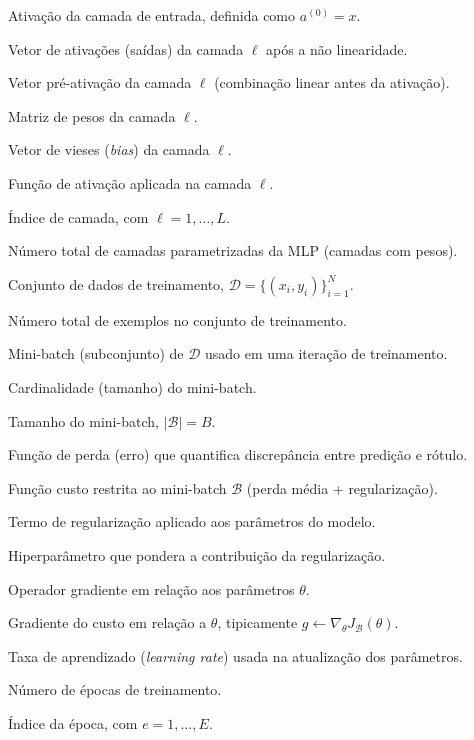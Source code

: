 \documentclass[
	12pt,				%
	oneside,
	a4paper,			%
	english,			%
	french,				%
	spanish,			%
	brazil				%
	]{abntex2}
\begin{document}
\begin{simbolos}
\item[\textbf{$a^{(0)}$}] Ativação da camada de entrada, definida como $a^{(0)} = x$.
\item[\textbf{$a^{(\ell)}$}] Vetor de ativações (saídas) da camada $\ell$ após a não linearidade.
\item[\textbf{$z^{(\ell)}$}] Vetor pré-ativação da camada $\ell$ (combinação linear antes da ativação).
\item[\textbf{$W^{(\ell)}$}] Matriz de pesos da camada $\ell$.
\item[\textbf{$b^{(\ell)}$}] Vetor de vieses (\textit{bias}) da camada $\ell$.
\item[\textbf{$\phi^{(\ell)}(\cdot)$}] Função de ativação aplicada na camada $\ell$.
\item[\textbf{$\ell$}] Índice de camada, com $\ell = 1,\ldots,L$.
\item[\textbf{$L$}] Número total de camadas parametrizadas da MLP (camadas com pesos).

\item[\textbf{$\mathcal{D}$}] Conjunto de dados de treinamento, $\mathcal{D}=\{(x_i,y_i)\}_{i=1}^{N}$.
\item[\textbf{$N$}] Número total de exemplos no conjunto de treinamento.
\item[\textbf{$\mathcal{B}$}] Mini-batch (subconjunto) de $\mathcal{D}$ usado em uma iteração de treinamento.
\item[\textbf{$|\mathcal{B}|$}] Cardinalidade (tamanho) do mini-batch.
\item[\textbf{$B$}] Tamanho do mini-batch, $|\mathcal{B}|=B$.

\item[\textbf{$\mathcal{L}(\hat{y},y)$}] Função de perda (erro) que quantifica discrepância entre predição e rótulo.
\item[\textbf{$J_{\mathcal{B}}(\theta)$}] Função custo restrita ao mini-batch $\mathcal{B}$ (perda média + regularização).
\item[\textbf{$\Omega(\theta)$}] Termo de regularização aplicado aos parâmetros do modelo.
\item[\textbf{$\lambda$}] Hiperparâmetro que pondera a contribuição da regularização.

\item[\textbf{$\nabla_{\theta}$}] Operador gradiente em relação aos parâmetros $\theta$.
\item[\textbf{$g$}] Gradiente do custo em relação a $\theta$, tipicamente $g \gets \nabla_{\theta} J_{\mathcal{B}}(\theta)$.
\item[\textbf{$\eta$}] Taxa de aprendizado (\textit{learning rate}) usada na atualização dos parâmetros.

\item[\textbf{$E$}] Número de épocas de treinamento.
\item[\textbf{$e$}] Índice da época, com $e = 1,\ldots,E$.
\end{simbolos}
\end{document}
